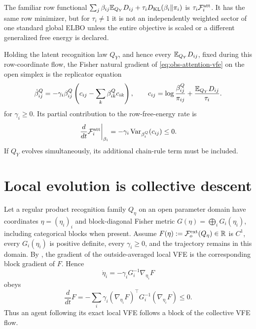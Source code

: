 The familiar row functional
$\sum_j\beta_{ij}\mathbb E_{Q_Y}D_{ij}+\tau_iD_{\mathrm{KL}}(\beta_i\Vert\pi_i)$ is
$\tau_i\mathcal F_i^{\rm att}$.  It has the same row minimizer, but for
$\tau_i\ne1$ it is not an independently weighted sector of one standard
global ELBO unless the entire objective is scaled or a different generalized
free energy is declared.  

Holding the latent recognition law $Q_Y$, and hence every
$\mathbb E_{Q_Y}D_{ij}$, fixed
during this row-coordinate flow, the Fisher natural gradient of
\eqref{eq:obs-attention-vfe} on the open simplex is the replicator equation
\begin{equation}
\dot\beta^Q_{ij}
=-\gamma_i\beta^Q_{ij}
\left(c_{ij}-\sum_k\beta^Q_{ik}c_{ik}\right),
\qquad
c_{ij}=\log\frac{\beta^Q_{ij}}{\pi_{ij}}
+\frac{\mathbb E_{Q_Y}D_{ij}}{\tau_i}.
\label{eq:obs-attention-replicator}
\end{equation}
for $\gamma_i\geq0$.  Its partial contribution to the row-free-energy rate is
\begin{equation}
\left.\frac{d}{dt}\mathcal F_i^{\rm att}\right|_{\beta_i}
=-\gamma_i\operatorname{Var}_{\beta^Q_i}(c_{ij})\leq0.
\label{eq:obs-attention-dissipation}
\end{equation}
If $Q_Y$ evolves simultaneously, its additional chain-rule term must be
included.  

\section{Local evolution is collective descent}
\label{sec:local-natural-gradient}

Let a regular product recognition family $Q_\eta$ on an open parameter domain
have coordinates $\eta=(\eta_i)_i$ and block-diagonal Fisher metric
$G(\eta)=\bigoplus_iG_i(\eta_i)$, including categorical blocks when present.
Assume $F(\eta):=\mathcal F_o^{\rm ext}(Q_\eta)\in\mathbb R$ is $C^1$, every
$G_i(\eta_i)$ is positive definite, every $\gamma_i\geq0$, and the trajectory
remains in this domain.
By , the gradient of the outside-averaged
local VFE is the corresponding block gradient of $F$.  Hence
\begin{equation}
\dot\eta_i=-\gamma_iG_i^{-1}\nabla_{\eta_i}F
\label{eq:obs-local-natural-gradient}
\end{equation}
obeys
\begin{equation}
\frac{d}{dt}F
=-\sum_i\gamma_i
(\nabla_{\eta_i}F)^\top
G_i^{-1}(\nabla_{\eta_i}F)\leq0.
\label{eq:obs-global-dissipation}
\end{equation}
Thus an agent following its exact local VFE follows a block of the collective
VFE flow.  

